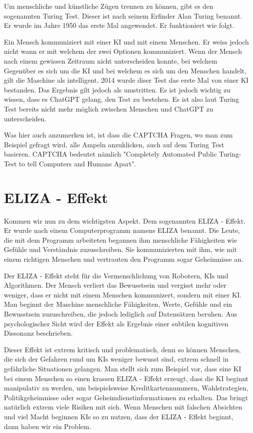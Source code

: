 \documentclass{report}
\begin{document}
Um menschliche und künstliche Zügen trennen zu können, gibt es den sogenannten Turing Test. Dieser ist nach seinem Erfinder Alan Turing benannt. Er wurde im Jahre 1950 das erste Mal angewendet. Er funktioniert wie folgt.
\par
Ein Mensch kommuniziert mit einer KI und mit einem Menschen. Er weiss jedoch nicht wann er mit welchem der zwei Optionen kommuniziert. Wenn der Mensch nach einem gewissen Zeitraum nicht unterscheiden konnte, bei welchem Gegenüber es sich um die KI und bei welchem es sich um den Menschen handelt, gilt die Maschine als intelligent. 2014 wurde diser Test das erste Mal von einer KI bestanden. Das Ergebnis gilt jedoch als umstritten. Es ist jedoch wichtig zu wissen, dass es ChatGPT gelang, den Test zu bestehen. Es ist also laut Turing Test bereits nicht mehr möglich zwischen Menschen und ChatGPT zu unterscheiden.
\par 
Was hier auch anzumerken ist, ist dass die CAPTCHA Fragen, wo man zum Beispiel gefragt wird, alle Ampeln anzuklicken, auch auf dem Turing Test basieren. CAPTCHA bedeutet nämlich "Completely Automated Public Turing-Test to tell Computers and Humans Apart".

\section{ELIZA - Effekt}
Kommen wir nun zu dem wichtigsten Aspekt. Dem sogenannten ELIZA - Effekt. Er wurde nach einem Computerprogramm namens ELIZA benannt. Die Leute, die mit dem Programm arbeiteten begannen ihm menschliche Fähigkeiten wie Gefühle und Verständnis zuzuschreiben. Sie kommunizierten mit ihm, wie mit einem richtigen Menschen und vertrauten den Programm sogar Geheimnisse an.
\par 
Der ELIZA - Effekt steht für die Vermenschlichung von Robotern, KIs und Algorithmen. Der Mensch verliert das Bewusstsein und vergisst mehr oder weniger, dass er nicht mit einem Menschen kommunizert, sondern mit einer KI. Man beginnt der Maschine menschliche Fähigkeiten, Werte, Gefühle und ein Bewusstsein zuzuschreiben, die jedoch lediglich auf Datensätzen beruhen. Aus psychologischer Sicht wird der Effekt als Ergebnis einer subtilen kognitiven Dissonanz beschrieben. 
\par
Dieser Effekt ist extrem kritisch und problematisch, denn so können Menschen, die sich der Gefahren rund um KIs weniger bewusst sind, extrem schnell in gefährliche Situationen gelangen. Man stellt sich zum Beispiel vor, dass eine KI bei einem Menschen so einen krassen ELIZA - Effekt erzeugt, dass die KI beginnt manipulativ zu werden, um beispielsweise Kreditkartennummern, Wahlstrategien, Politikgeheimnisse oder sogar Geheimdienstinformationen zu erhalten. Das bringt natürlich extrem viele Risiken mit sich. Wenn Menschen mit falschen Absichten und viel Macht beginnen KIs so zu nutzen, dass der ELIZA - Effekt beginnt, dann haben wir ein Problem. 
\end{document}

